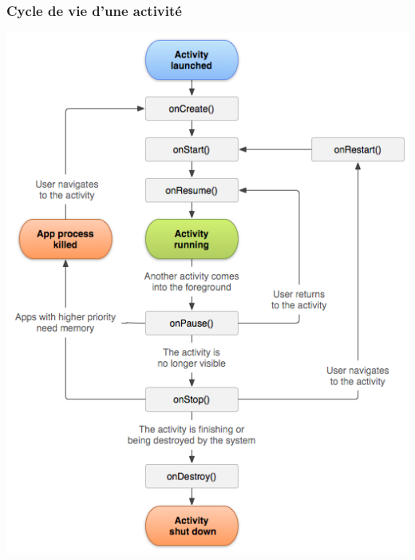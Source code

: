 \documentclass{beamer}
\begin{document}
\begin{frame}

\frametitle{Cycle de vie d'une activité}

\begin{center}
\includegraphics[scale=0.3]{activity_lifecycle.png}
\end{center}

\end{frame}
\end{document}
